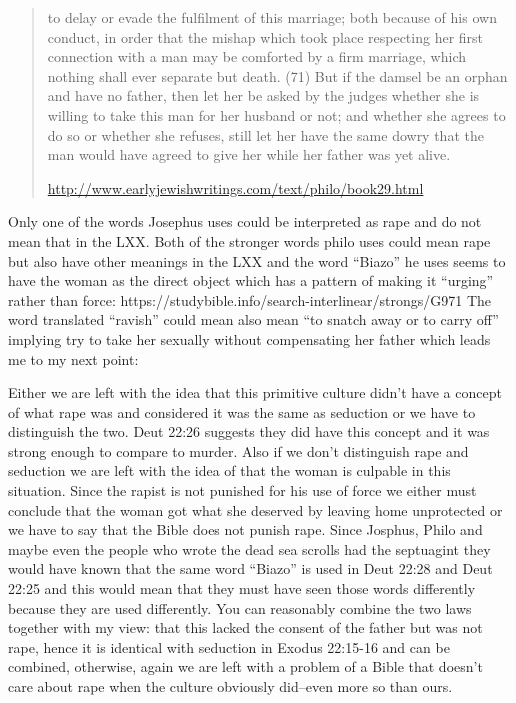 \documentclass[11pt]{article}
\begin{document}
\begin{quote}
to delay or evade the fulfilment of this marriage; both because of his own conduct, in order that the mishap which took place respecting her first connection with a man may be comforted by a firm marriage, which nothing shall ever separate but death. (71) But if the damsel be an orphan and have no father, then let her be asked by the judges whether she is willing to take this man for her husband or not; and whether she agrees to do so or whether she refuses, still let her have the same dowry that the man would have agreed to give her while her father was yet alive.

\url{http://www.earlyjewishwritings.com/text/philo/book29.html}
\end{quote}



 Only one of the words Josephus uses could be interpreted as rape and do not mean that in the LXX. Both of the stronger words philo uses could mean rape but also have other meanings in the LXX and the word “Biazo” he uses seems to have the woman as the direct object which has a pattern of making it “urging” rather than force: https://studybible.info/search-interlinear/strongs/G971 The word translated “ravish” could mean also mean “to snatch away or to carry off” implying try to take her sexually without compensating her father which leads me to my next point:



Either we are left with the idea that this primitive culture didn’t have a concept of what rape was and considered it was the same as seduction or we have to distinguish the two. Deut 22:26 suggests they did have this concept and it was strong enough to compare to murder. Also if we don’t distinguish rape and seduction we are left with the idea of that the woman is culpable in this situation. Since the rapist is not punished for his use of force we either must conclude that the woman got what she deserved by leaving home unprotected or we have to say that the Bible does not punish rape. Since Josphus, Philo and maybe even the people who wrote the dead sea scrolls had the septuagint they would have known that the same word “Biazo” is used in Deut 22:28 and Deut 22:25 and this would mean that they must have seen those words differently because they are used differently. You can reasonably combine the two laws together with my view: that this lacked the consent of the father but was not rape, hence it is identical with seduction in Exodus 22:15-16 and can be combined, otherwise, again we are left with a problem of a Bible that doesn’t care about rape when the culture obviously did--even more so than ours.
\end{document}
